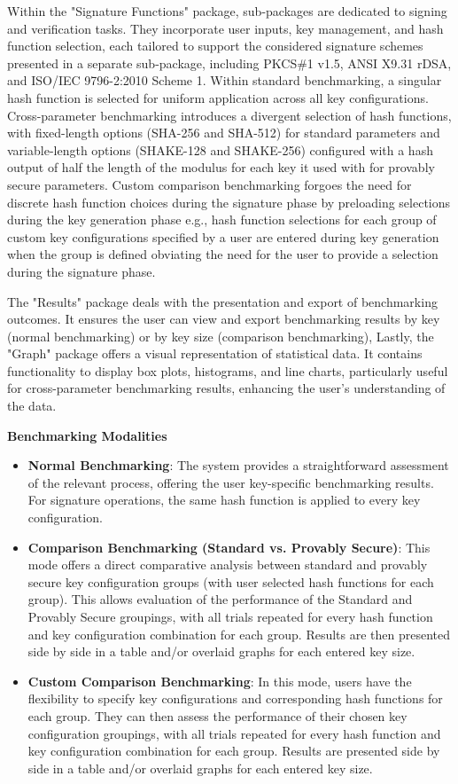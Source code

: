 \documentclass[]{final_report}
\theoremstyle{definition}
\begin{document}
Within the "Signature Functions" package, sub-packages are dedicated to signing and verification tasks. They incorporate user inputs, key management, and hash function selection, each tailored to support the considered signature schemes presented in a separate sub-package, including PKCS\#1 v1.5, ANSI X9.31 rDSA, and ISO/IEC 9796-2:2010 Scheme 1. Within standard benchmarking, a singular hash function is selected for uniform application across all key configurations. Cross-parameter benchmarking introduces a divergent selection of hash functions, with fixed-length options (SHA-256 and SHA-512) for standard parameters and variable-length options (SHAKE-128 and SHAKE-256) configured with a hash output of half the length of the modulus  for each key it used with for provably secure parameters. Custom comparison benchmarking forgoes the need for discrete hash function choices during the signature phase by preloading selections during the key generation phase e.g., hash function selections for each group of custom key configurations specified by a user are entered during key generation when the group is defined obviating the need for the user to provide a selection during the signature phase.

The "Results" package deals with the presentation and export of benchmarking outcomes. It ensures the user can view and export benchmarking results by key (normal benchmarking) or by key size (comparison benchmarking),
Lastly, the "Graph" package offers a visual representation of statistical data. It contains functionality to display box plots, histograms, and line charts, particularly useful for cross-parameter benchmarking results, enhancing the user's understanding of the data.


\textbf{Benchmarking Modalities}

\begin{itemize}
    \item \textbf{Normal Benchmarking}: The system provides a straightforward assessment of the relevant process, offering the user key-specific benchmarking results. For signature operations, the same hash function is applied to every key configuration.
     \item \textbf{Comparison Benchmarking (Standard vs. Provably Secure)}: This mode offers a direct comparative analysis between standard and provably secure key configuration groups (with user selected hash functions for each group). This allows evaluation of the performance of the Standard and Provably Secure groupings, with all trials repeated for every hash function and key configuration combination for each group. Results are then presented side by side in a table and/or overlaid graphs for each entered key size. 
     \item \textbf{Custom Comparison Benchmarking}: In this mode, users have the flexibility to specify key configurations and corresponding hash functions for each group. They can then assess the performance of their chosen key configuration groupings, with all trials repeated for every hash function and key configuration combination for each group. Results are presented side by side in a table and/or overlaid graphs for each entered key size.
\end{itemize}
\end{document}
